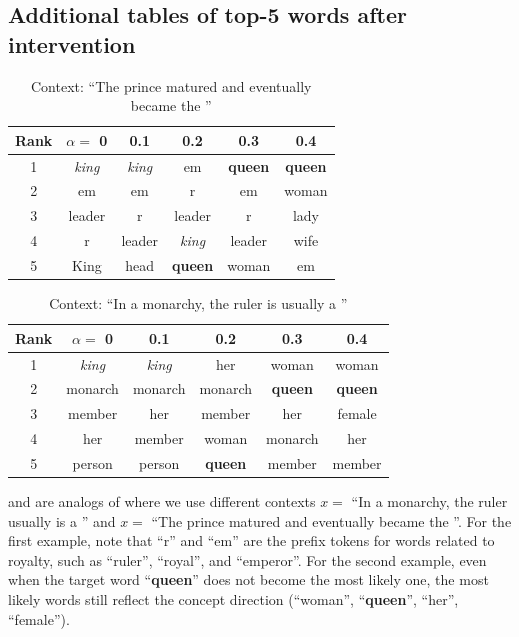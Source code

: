 \documentclass{article}
\theoremstyle{plain}
\theoremstyle{definition}
\theoremstyle{remark}
\begin{document}
\subsection{Additional tables of top-5 words after intervention}\label{sec:additional_tables}
\begin{table}[t]
\caption{Context: ``The prince matured and eventually became the ''}
\label{tbl:appendix_intervention_topk1}
\vskip 0.15in
\begin{center}
\begin{small}
\begin{tabular}{cccccc}
\toprule
Rank  & $\alpha = $ 0 & 0.1 & 0.2 & 0.3 & 0.4 \\
\midrule
1 & \it king & \it king & em & \bf queen & \bf queen \\
2 & em & em & r & em & woman \\
3 & leader & r & leader & r & lady \\
4 & r & leader & \it king & leader & wife \\
5 & King & head & \bf queen & woman & em \\
\bottomrule
\end{tabular}
\end{small}
\end{center}
\vskip -0.1in
\end{table}

\begin{table}[t]
\caption{Context: ``In a monarchy, the ruler is usually a ''}
\label{tbl:appendix_intervention_topk2}
\vskip 0.15in
\begin{center}
\begin{small}
\begin{tabular}{cccccc}
\toprule
Rank  & $\alpha = $ 0 & 0.1 & 0.2 & 0.3 & 0.4 \\
\midrule
1 & \it king & \it king & her & woman & woman \\
2 & monarch & monarch & monarch & \bf queen & \bf queen \\
3 & member & her & member & her & female \\
4 & her & member & woman & monarch & her \\
5 & person & person & \bf queen & member & member \\
\bottomrule
\end{tabular}
\end{small}
\end{center}
\vskip -0.1in
\end{table}
 and  are analogs of  where we use different contexts $x=$ ``In a monarchy, the ruler usually is a '' and $x=$ ``The prince matured and eventually became the ''.
For the first example, note that ``r'' and ``em'' are the prefix tokens for words related to royalty, such as ``ruler'', ``royal'', and ``emperor''. For the second example, even when the target word ``\textbf{queen}'' does not become the most likely one, the most likely words still reflect the concept direction (``woman'', ``\textbf{queen}'', ``her'', ``female'').
\end{document}

